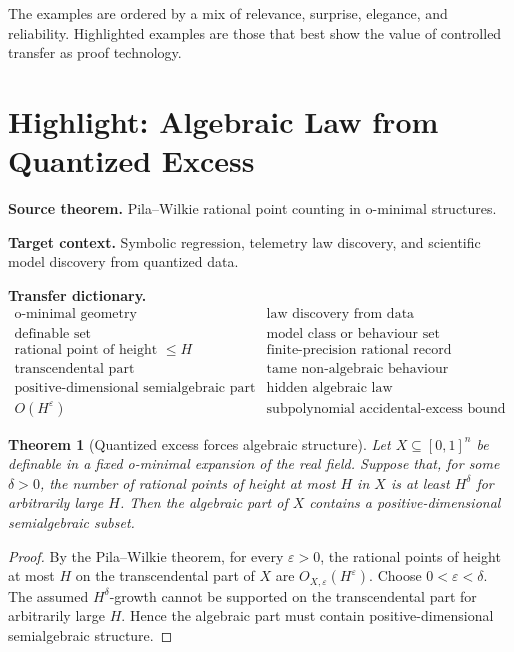 \documentclass[11pt]{article}
\newtheorem{theorem}{Theorem}[section]
\begin{document}
The examples are ordered by a mix of relevance, surprise, elegance, and reliability. Highlighted examples are those that best show the value of controlled transfer as proof technology.

\section{Highlight: Algebraic Law from Quantized Excess}

\textbf{Source theorem.}
Pila--Wilkie rational point counting in o-minimal structures.

\textbf{Target context.}
Symbolic regression, telemetry law discovery, and scientific model discovery from quantized data.

\textbf{Transfer dictionary.}
\[
\begin{array}{c|c}
\text{o-minimal geometry} & \text{law discovery from data}\\ \hline
\text{definable set} & \text{model class or behaviour set}\\
\text{rational point of height }\leq H & \text{finite-precision rational record}\\
\text{transcendental part} & \text{tame non-algebraic behaviour}\\
\text{positive-dimensional semialgebraic part} & \text{hidden algebraic law}\\
O(H^\varepsilon) & \text{subpolynomial accidental-excess bound}
\end{array}
\]

\begin{theorem}[Quantized excess forces algebraic structure]
Let \(X\subseteq[0,1]^n\) be definable in a fixed o-minimal expansion of the real field. Suppose that, for some \(\delta>0\), the number of rational points of height at most \(H\) in \(X\) is at least \(H^\delta\) for arbitrarily large \(H\). Then the algebraic part of \(X\) contains a positive-dimensional semialgebraic subset.
\end{theorem}

\begin{proof}
By the Pila--Wilkie theorem, for every \(\varepsilon>0\), the rational points of height at most \(H\) on the transcendental part of \(X\) are \(O_{X,\varepsilon}(H^\varepsilon)\). Choose \(0<\varepsilon<\delta\). The assumed \(H^\delta\)-growth cannot be supported on the transcendental part for arbitrarily large \(H\). Hence the algebraic part must contain positive-dimensional semialgebraic structure.
\end{proof}
\end{document}
